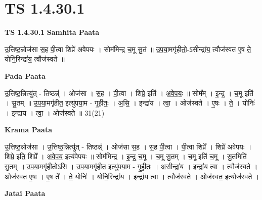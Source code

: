 \documentclass[17pt]{extarticle}
\begin{document}
\section{ TS 1.4.30.1 }

\textbf{TS 1.4.30.1 } \newline
\textbf{Samhita Paata} \newline

उ॒त्तिष्ठ॒न्नोज॑सा स॒ह पी॒त्वा शिप्रे॑ अवेपयः । सोम॑मिन्द्र च॒मू सु॒तं ॥ उ॒प॒या॒मगृ॑हीतो॒-ऽसीन्द्रा॑य॒ त्वौज॑स्वत ए॒ष ते॒ योनि॒रिन्द्रा॑य॒ त्वौज॑स्वते ॥ \newline

\textbf{Pada Paata} \newline

उ॒त्तिष्ठ॒न्नित्यु॑त् - तिष्ठन्न्॑ । ओज॑सा । स॒ह । पी॒त्वा । शिप्रे॒ इति॑ । अ॒वे॒प॒यः॒ ॥ सोम᳚म् । इ॒न्द्र॒ । च॒मू इति॑ । सु॒तम् ॥ उ॒प॒या॒मगृ॑हीत॒ इत्यु॑पया॒म - गृ॒ही॒तः॒ । अ॒सि॒ । इन्द्रा॑य । त्वा॒ । ओज॑स्वते । ए॒षः । ते॒ । योनिः॑ । इन्द्रा॑य । त्वा॒ । ओज॑स्वते ॥ 31(21)  \newline


\textbf{Krama Paata} \newline

उ॒त्तिष्ठ॒न्नोज॑सा । उ॒त्तिष्ठ॒न्नित्यु॑त् - तिष्ठन्न्॑ । ओज॑सा स॒ह । स॒ह पी॒त्वा । पी॒त्वा शिप्रे᳚ । शिप्रे॑ अवेपयः । शिप्रे॒ इति॒ शिप्रे᳚ । अ॒वे॒प॒य॒ इत्य॑वेपयः ॥ सोम॑मिन्द्र । इ॒न्द्र॒ च॒मू । च॒मू सु॒तम् । च॒मू इति॑ च॒मू । सु॒तमिति॑ सु॒तम् ॥ उ॒प॒या॒मगृ॑हीतोऽसि । उ॒प॒या॒मगृ॑हीत॒ इत्यु॑पया॒म - गृ॒ही॒तः॒ । अ॒सीन्द्रा॑य । इन्द्रा॑य त्वा । त्वौज॑स्वते । ओज॑स्वत ए॒षः । ए॒ष ते᳚ । ते॒ योनिः॑ । योनि॒रिन्द्रा॑य । इन्द्रा॑य त्वा । त्वौज॑स्वते । ओज॑स्वत॒ इत्योज॑स्वते । \newline

\textbf{Jatai Paata} \newline
\end{document}
